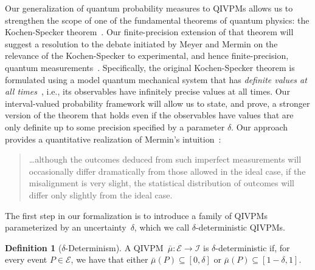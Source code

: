 \documentclass[english,reprint, aps, prl,superscriptaddress, showpacs,
showkeys, longbibliography, amsmath, amssymb, floatfix]{revtex4-1}
\theoremstyle{plain}
\theoremstyle{definition}
\newtheorem{definition}{Definition}
\newcommand{\events}{\ensuremath{\mathcal{E}}}
\begin{document}
Our generalization of quantum probability measures to QIVPMs allows us
to strengthen the scope of one of the fundamental theorems of quantum
physics: the Kochen-Specker
theorem~\cite{kochenspecker1967,Redhead1987-REDINA,peres1995quantum,Jaeger2007,Held2016}. Our
finite-precision extension of that theorem will suggest a resolution
to the debate initiated by Meyer and Mermin on the relevance of the
Kochen-Specker to experimental, and hence finite-precision, quantum
measurements~\citep{PhysRevLett.83.3751,Mermin1999,Kent1999,HavlicekKrennSummhammerSvozil2001,SimonBruknerZeilinger2001,Cabello2002,Larsson2002,Appleby2002,BarrettKent2004,Appleby_2005,Spekkens2005,GuehneKleinmannCabelloEtAl2010,MazurekPuseyKunjwalEtAl2016}.
Specifically, the original Kochen-Specker theorem is formulated using
a model quantum mechanical system that has \emph{definite values at
  all times}~\cite{Held2016}, i.e., its observables have infinitely
precise values at all times. Our interval-valued probability framework
will allow us to state, and prove, a stronger version of the theorem
that holds even if the observables have values that are only definite
up to some precision specified by a parameter $\delta$. Our approach
provides a quantitative realization of Mermin's
intuition~\citep{Mermin1999}:
\begin{quote}
  \ldots although the outcomes deduced from such imperfect
  measurements will occasionally differ dramatically from those
  allowed in the ideal case, if the misalignment is very slight, the
  statistical distribution of outcomes will differ only slightly from
  the ideal case.
\end{quote}


The first step in our formalization is to introduce a family of QIVPMs
parameterized by an uncertainty~$\delta$, which we call
$\delta$-deterministic QIVPMs.

\begin{definition}[$\delta$-Determinism]\label{def:delta-deterministic} A
  QIVPM~$\bar{\mu}:\events\rightarrow\mathscr{I}$ is
  $\delta$-deterministic if, for every event $P\in\events$, we have
  that either 
  $\bar{\mu}\left(P\right)\subseteq\left[0,\delta\right]$ or
  $\bar{\mu}\left(P\right)\subseteq\left[1-\delta,1\right]$. 
\end{definition}
\end{document}
